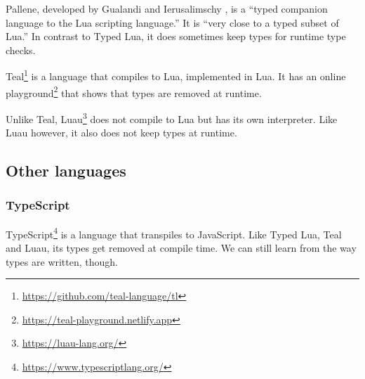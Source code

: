 Pallene, developed by Gualandi and Ierusalimschy \cite{gualandi2020pallene}, is a ``typed companion language to the Lua scripting language.'' It is ``very close to a typed subset of Lua.'' In contrast to Typed Lua, it does sometimes keep types for runtime type checks.

Teal\footnote{\url{https://github.com/teal-language/tl}} is a language that compiles to Lua, implemented in Lua. It has an online playground\footnote{\url{https://teal-playground.netlify.app}} that shows that types are removed at runtime.

Unlike Teal, Luau\footnote{\url{https://luau-lang.org/}} does not compile to Lua but has its own interpreter. Like Luau however, it also does not keep types at runtime.

\subsection{Other languages}
\subsubsection{TypeScript}
TypeScript\footnote{\url{https://www.typescriptlang.org/}} is a language that transpiles to JavaScript. Like Typed Lua, Teal and Luau, its types get removed at compile time. We can still learn from the way types are written, though.
